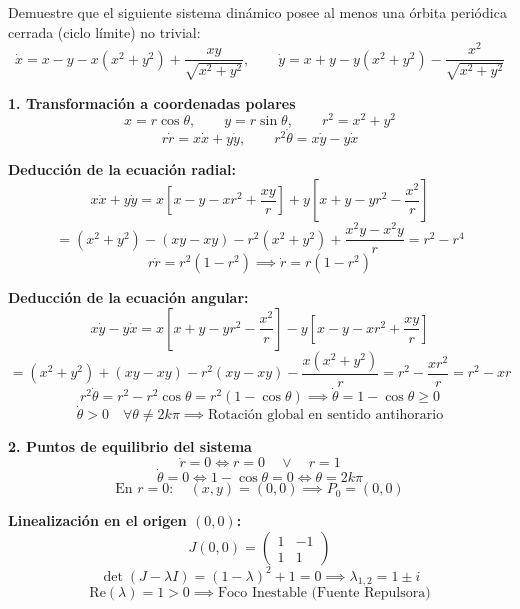 \documentclass[11pt,a4paper]{article}
\newenvironment{solucion}[1][Solución Detallada]{%
    \vspace{1.5mm}%
    \noindent{\large\textbf{Solución:}}\par\vspace{1.5mm}%
}{%
    \par\vspace{3mm}%
}
\begin{document}
\vspace{3mm}

\begin{problema}[Problema 2.5]
Demuestre que el siguiente sistema dinámico posee al menos una órbita periódica cerrada (ciclo límite) no trivial:
\[
\dot{x} = x - y - x(x^2 + y^2) + \frac{x y}{\sqrt{x^2+y^2}}, \qquad \dot{y} = x + y - y(x^2 + y^2) - \frac{x^2}{\sqrt{x^2+y^2}}
\]
\end{problema}

\begin{solucion}

\textbf{\large 1. Transformación a coordenadas polares}
\[
x = r\cos\theta, \qquad y = r\sin\theta, \qquad r^2 = x^2 + y^2
\]
\[
r\dot{r} = x\dot{x} + y\dot{y}, \qquad r^2\dot{\theta} = x\dot{y} - y\dot{x}
\]

\textbf{Deducción de la ecuación radial:}
\[
x\dot{x} + y\dot{y} = x\left[x - y - x r^2 + \frac{xy}{r}\right] + y\left[x + y - y r^2 - \frac{x^2}{r}\right]
\]
\[
= (x^2 + y^2) - (xy - xy) - r^2(x^2 + y^2) + \frac{x^2y - x^2y}{r} = r^2 - r^4
\]
\[
r\dot{r} = r^2(1 - r^2) \implies \boxed{\dot{r} = r(1 - r^2)}
\]

\textbf{Deducción de la ecuación angular:}
\[
x\dot{y} - y\dot{x} = x\left[x + y - y r^2 - \frac{x^2}{r}\right] - y\left[x - y - x r^2 + \frac{xy}{r}\right]
\]
\[
= (x^2 + y^2) + (xy - xy) - r^2(xy - xy) - \frac{x(x^2 + y^2)}{r} = r^2 - \frac{x r^2}{r} = r^2 - xr
\]
\[
r^2\dot{\theta} = r^2 - r^2\cos\theta = r^2(1 - \cos\theta) \implies \boxed{\dot{\theta} = 1 - \cos\theta \ge 0}
\]
\[
\dot{\theta} > 0 \quad \forall \theta \neq 2k\pi \implies \text{Rotación global en sentido antihorario}
\]

\vspace{3.5mm}

\textbf{\large 2. Puntos de equilibrio del sistema}
\[
\dot{r} = 0 \iff r = 0 \quad \lor \quad r = 1
\]
\[
\dot{\theta} = 0 \iff 1 - \cos\theta = 0 \iff \theta = 2k\pi
\]
\[
\text{En } r = 0: \quad (x, y) = (0, 0) \implies \boxed{P_0 = (0, 0)}
\]

\textbf{Linealización en el origen $(0, 0)$:}
\[
J(0, 0) = \begin{pmatrix} 1 & -1 \\ 1 & 1 \end{pmatrix}
\]
\[
\det(J - \lambda I) = (1 - \lambda)^2 + 1 = 0 \implies \lambda_{1,2} = 1 \pm i
\]
\[
\boxed{\mathrm{Re}(\lambda) = 1 > 0 \implies \text{Foco Inestable (Fuente Repulsora)}}
\]

\vspace{3.5mm}


\end{solucion}
\end{document}
